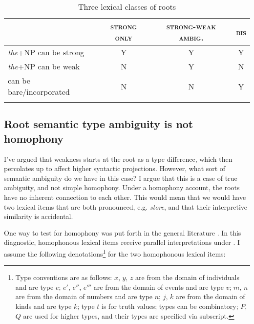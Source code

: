 \documentclass[output=paper,
modfonts
]{langscibook}
\begin{document}
\begin{table}[h]
\caption{Three lexical classes of roots}
\label{tab:williams:3}
\begin{tabularx}{\textwidth}{Qccc} 
 \lsptoprule
 & \textsc{strong only} & \textsc{strong-weak ambig.}  & \textsc{bis}\\ 
 \midrule
 \textit{the}+NP can be strong  &  \textsc{Y} &     \textsc{Y}  &  \textsc{Y}  \\
 \textit{the}+NP can be weak  &   \textsc{N}  & \textsc{Y} & \textsc{N} \\
 can be bare/incorporated  &   \textsc{N}  & \textsc{N} & \textsc{Y} \\
 \lspbottomrule
\end{tabularx}
\end{table}

\subsection{Root semantic type ambiguity is not homophony}

I've argued that weakness starts at the root as a type difference, which then percolates up to affect higher syntactic projections. However, what sort of semantic ambiguity do we have in this case? I argue that this is a case of true ambiguity, and not simple homophony.  Under a homophony account, the roots have no inherent connection to each other. This would mean that we would have two lexical items that are both pronounced, e.g. \textit{store}, and that their interpretive similarity is accidental. 

One way to test for homophony was put forth in the general  literature \citep{RullmannYou2006,wilhelm2008}. In this diagnostic, homophonous lexical items receive parallel interpretations under . I assume the following denotations\footnote{Type conventions are as follows: $x$, $y$, $z$ are from the domain of individuals and are type $e$; $e'$, $e''$, $e'''$ are from the domain of events and are type $v$; $m$, $n$ are from the domain of numbers and are type $n$; $j$, $k$ are from the domain of kinds and are type $k$; type $t$ is for truth values; types can be combinatory; $P$, $Q$ are used for higher types, and their types are specified via subscript.} for the two homophonous lexical items: 

\begin{exe}
\end{exe}
\end{document}
